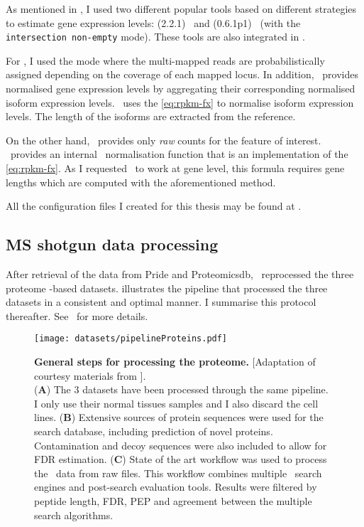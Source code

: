 As mentioned in , I used two different popular tools based on
different strategies to estimate
gene expression levels:
(2.2.1)~
and 
(0.6.1p1)~ (with the \texttt{intersection non-empty} mode).
These tools are also integrated in \irap.

For \cuffl, I used the mode where the multi-mapped reads are probabilistically
assigned depending on the coverage of each mapped locus. In addition,
\cuffl\ provides normalised gene expression levels by aggregating their
corresponding normalised isoform expression levels. \cuffl\ uses the
\cref{eq:rpkm-fx} to normalise isoform expression levels. The length of the
isoforms are extracted from the reference.

On the other hand, \htseq\ provides only \emph{raw} counts for the feature of
interest. \irap\ provides an internal \FPKM\ normalisation function that
is an implementation of the \cref{eq:rpkm-fx}. As I requested \htseq\ to work at
gene level, this formula requires gene lengths which are computed with the
aforementioned method.

All the configuration files I created for this thesis may be found at
\addressToirapConfFiles.

\subsection{MS shotgun data processing}

After retrieval of the data from \gls{Pride} and \gls{Proteomicsdb},
\james\ reprocessed the three proteome \ms-based datasets.
 illustrates the pipeline that processed the three
datasets in a consistent and optimal manner. I summarise this protocol
thereafter. See~ for more details.

  \begin{sidewaysfigure}
      \texttt{[image: datasets/pipelineProteins.pdf]}\centering
      \caption[General steps for processing the proteome
      data]{\label{fig:pipelineProt}\textbf{General steps for processing the
      proteome.} [Adaptation of courtesy materials from \james].\\
      (\textbf{A}) The 3 datasets have been processed through the
      same pipeline. I only use their normal tissues samples and I also discard
      the cell lines. (\textbf{B}) Extensive sources of protein sequences were
      used for the search database, including prediction of novel proteins.
      Contamination and decoy sequences were also included to allow for \gls{FDR}
      estimation. (\textbf{C}) State of the art workflow was used to process the
      \ms\ data from raw files.
      This workflow combines multiple \ms\ search engines and
      post-search evaluation tools. Results were filtered by peptide length,
      \gls{FDR}, \gls{PEP} and agreement between the multiple search algorithms.}
  \end{sidewaysfigure}

